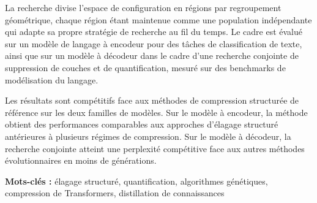 La recherche divise l'espace de configuration en régions par regroupement géométrique, chaque région étant maintenue comme une population indépendante qui adapte sa propre stratégie de recherche au fil du temps. Le cadre est évalué sur un modèle de langage à encodeur pour des tâches de classification de texte, ainsi que sur un modèle à décodeur dans le cadre d'une recherche conjointe de suppression de couches et de quantification, mesuré sur des benchmarks de modélisation du langage.

Les résultats sont compétitifs face aux méthodes de compression structurée de référence sur les deux familles de modèles. Sur le modèle à encodeur, la méthode obtient des performances comparables aux approches d'élagage structuré antérieures à plusieurs régimes de compression. Sur le modèle à décodeur, la recherche conjointe atteint une perplexité compétitive face aux autres méthodes évolutionnaires en moins de générations.

\vspace{1em}
\noindent\textbf{Mots-clés :} élagage structuré, quantification, algorithmes génétiques, compression de Transformers, distillation de connaissances

\clearpage

\ifPDFTeX
